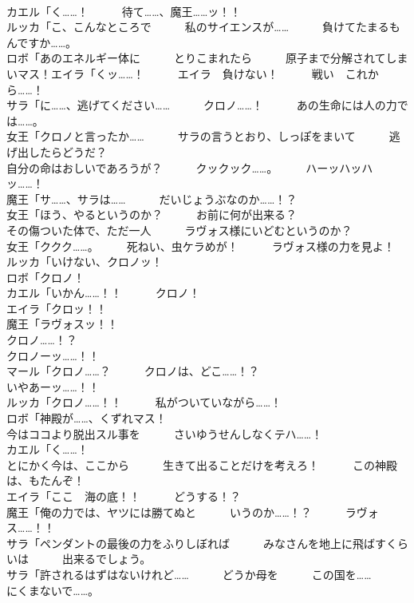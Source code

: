 \documentclass[8pt]{extreport}
\begin{document}
\begin{CJK}{UTF8}{min}
\\	カエル「く……！　　　待て……、魔王……ッ！！	
\\	ルッカ「こ、こんなところで　　　私のサイエンスが……　　　負けてたまるもんですか……。	
\\	ロボ「あのエネルギー体に　　　とりこまれたら　　　原子まで分解されてしまいマス！エイラ「くッ……！　　　エイラ　負けない！　　　戦い　これから……！	
\\	サラ「に……、逃げてください……　　　クロノ……！　　　あの生命には人の力では……。	
\\	女王「クロノと言ったか……　　　サラの言うとおり、しっぽをまいて　　　逃げ出したらどうだ？	
\\	自分の命はおしいであろうが？　　　クックック……。　　　ハーッハッハッ……！	
\\	魔王「サ……、サラは……　　　だいじょうぶなのか……！？	
\\	女王「ほう、やるというのか？　　　お前に何が出来る？	
\\	その傷ついた体で、ただ一人　　　ラヴォス様にいどむというのか？	
\\	女王「ククク……。　　　死ねい、虫ケラめが！　　　ラヴォス様の力を見よ！	
\\	ルッカ「いけない、クロノッ！	
\\	ロボ「クロノ！	
\\	カエル「いかん……！！　　　クロノ！	
\\	エイラ「クロッ！！	
\\	魔王「ラヴォスッ！！	
\\	クロノ……！？	
\\	クロノーッ……！！	
\\	マール「クロノ……？　　　クロノは、どこ……！？	
\\	いやあーッ……！！	
\\	ルッカ「クロノ……！！　　　私がついていながら……！	
\\	ロボ「神殿が……、くずれマス！	
\\	今はココより脱出スル事を　　　さいゆうせんしなくテハ……！	
\\	カエル「く……！	
\\	とにかく今は、ここから　　　生きて出ることだけを考えろ！　　　この神殿は、もたんぞ！	
\\	エイラ「ここ　海の底！！　　　どうする！？	
\\	魔王「俺の力では、ヤツには勝てぬと　　　いうのか……！？　　　ラヴォス……！！	
\\	サラ「ペンダントの最後の力をふりしぼれば　　　みなさんを地上に飛ばすくらいは　　　出来るでしょう。	
\\	サラ「許されるはずはないけれど……　　　どうか母を　　　この国を……　　　にくまないで……。	

\end{CJK}
\end{document}
